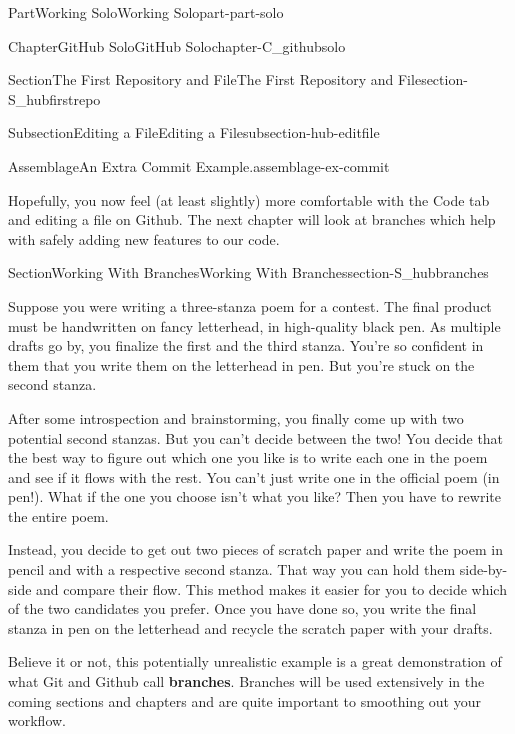 \documentclass[oneside,10pt,]{book}
\newcommand{\terminology}[1]{\textbf{#1}}
\begin{document}
\begin{partptx}{Part}{Working Solo}{}{Working Solo}{}{}{part-part-solo}
\begin{chapterptx}{Chapter}{GitHub Solo}{}{GitHub Solo}{}{}{chapter-C_githubsolo}
\begin{sectionptx}{Section}{The First Repository and File}{}{The First Repository and File}{}{}{section-S_hubfirstrepo}
\begin{subsectionptx}{Subsection}{Editing a File}{}{Editing a File}{}{}{subsection-hub-editfile}
\begin{assemblage}{Assemblage}{An Extra Commit Example.}{assemblage-ex-commit}
\end{assemblage}
\end{subsectionptx}
\begin{conclusion}{}%
Hopefully, you now feel (at least slightly) more comfortable with the Code tab and editing a file on Github. The next chapter will look at branches which help with safely adding new features to our code.%
\end{conclusion}%
\end{sectionptx}
%
%
\typeout{************************************************}
\typeout{************************************************}
%
\begin{sectionptx}{Section}{Working With Branches}{}{Working With Branches}{}{}{section-S_hubbranches}
%
%
\begin{introduction}{}%
Suppose you were writing a three-stanza poem for a contest. The final product must be handwritten on fancy letterhead, in high-quality black pen. As multiple drafts go by, you finalize the first and the third stanza. You're so confident in them that you write them on the letterhead in pen. But you're stuck on the second stanza.%
\par
After some introspection and brainstorming, you finally come up with two potential second stanzas. But you can't decide between the two! You decide that the best way to figure out which one you like is to write each one in the poem and see if it flows with the rest. You can't just write one in the official poem (in pen!). What if the one you choose isn't what you like? Then you have to rewrite the entire poem.%
\par
Instead, you decide to get out two pieces of scratch paper and write the poem in pencil and with a respective second stanza. That way you can hold them side-by-side and compare their flow. This method makes it easier for you to decide which of the two candidates you prefer. Once you have done so, you write the final stanza in pen on the letterhead and recycle the scratch paper with your drafts.%
\par
Believe it or not, this potentially unrealistic example is a great demonstration of what Git and Github call \terminology{branches}. Branches will be used extensively in the coming sections and chapters and are quite important to smoothing out your workflow.%
\end{introduction}%
%
%
\typeout{************************************************}

\end{sectionptx}
\end{chapterptx}
\end{partptx}
\end{document}
